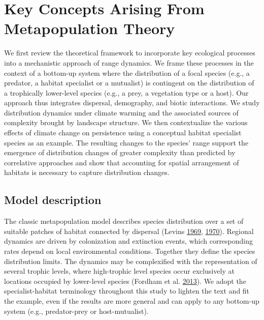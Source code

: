 \documentclass[12pt]{article}
\begin{document}
\hypertarget{key-concepts-arising-from-metapopulation-theory}{%
\section{Key Concepts Arising From Metapopulation
Theory}\label{key-concepts-arising-from-metapopulation-theory}}

We first review the theoretical framework to incorporate key ecological
processes into a mechanistic approach of range dynamics. We frame these
processes in the context of a bottom-up system where the distribution of
a focal species (e.g., a predator, a habitat specialist or a mutualist)
is contingent on the distribution of a trophically lower-level species
(e.g., a prey, a vegetation type or a host). Our approach thus
integrates dispersal, demography, and biotic interactions. We study
distribution dynamics under climate warming and the associated sources
of complexity brought by landscape structure. We then contextualize the
various effects of climate change on persistence using a conceptual
habitat specialist species as an example. The resulting changes to the
species' range support the emergence of distribution changes of greater
complexity than predicted by correlative approaches and show that
accounting for spatial arrangement of habitats is necessary to capture
distribution changes.

\hypertarget{model-description}{%
\subsection{Model description}\label{model-description}}

The classic metapopulation model describes species distribution over a
set of suitable patches of habitat connected by dispersal (Levins
\protect\hyperlink{ref-levins_demographic_1969}{1969},
\protect\hyperlink{ref-levins_mathematical_1970}{1970}). Regional
dynamics are driven by colonization and extinction events, which
corresponding rates depend on local environmental conditions. Together
they define the species distribution limits. The dynamics may be
complexified with the representation of several trophic levels, where
high-trophic level species occur exclusively at locations occupied by
lower-level species (Fordham et al.
\protect\hyperlink{ref-fordham_adapted_2013}{2013}). We adopt the
specialist-habitat terminology throughout this study to lighten the text
and fit the example, even if the results are more general and can apply
to any bottom-up system (e.g., predator-prey or host-mutualist).
\end{document}
